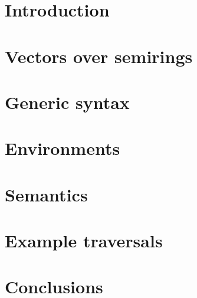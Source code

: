 \documentclass[sigplan,10pt,anonymous,review]{acmart}
\begin{document}
\section{Introduction}\label{sec:intro}


\section{Vectors over semirings}\label{sec:algebra}


\section{Generic syntax}\label{sec:syntax}


\section{Environments}\label{sec:env}


\section{Semantics}\label{sec:semantics}


\section{Example traversals}\label{sec:examples}


\section{Conclusions}\label{sec:conc}


\end{document}
